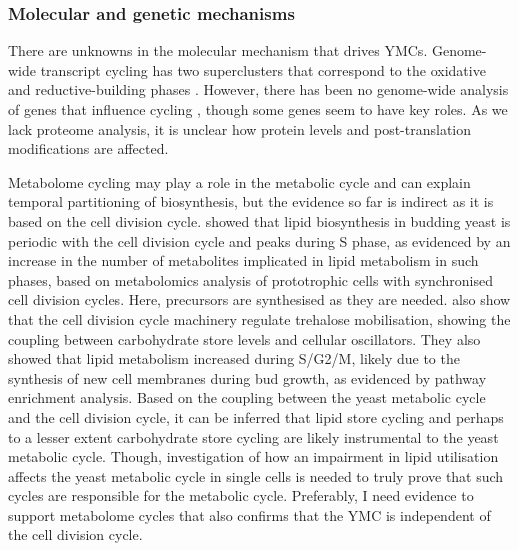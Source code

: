 \subsubsection{Molecular and genetic mechanisms}
\label{subsubsec:intro-ymc-unresolved-molecular}

There are unknowns in the molecular mechanism that drives YMCs.
Genome-wide transcript cycling has two superclusters that correspond to the oxidative and reductive-building phases \citep{machneYinYangYeast2012}.
However, there has been no genome-wide analysis of genes that influence cycling \citep{mellorMolecularBasisMetabolic2016}, though some genes seem to have key roles.
As we lack proteome analysis, it is unclear how protein levels and post-translation modifications are affected.


Metabolome cycling may play a role in the metabolic cycle and can explain temporal partitioning of biosynthesis, but the evidence so far is indirect as it is based on the cell division cycle.
\textcite{campbellBuildingBlocksAre2020} showed that lipid biosynthesis in budding yeast is periodic with the cell division cycle and peaks during S phase, as evidenced by an increase in the number of metabolites implicated in lipid metabolism in such phases, based on metabolomics analysis of prototrophic cells with synchronised cell division cycles.
Here, precursors are synthesised as they are needed.
\citet{ewaldYeastCyclinDependentKinase2016} also show that the cell division cycle machinery regulate trehalose mobilisation, showing the coupling between carbohydrate store levels and cellular oscillators.
They also showed that lipid metabolism increased during S/G2/M, likely due to the synthesis of new cell membranes during bud growth, as evidenced by pathway enrichment analysis.
Based on the coupling between the yeast metabolic cycle and the cell division cycle, it can be inferred that lipid store cycling and perhaps to a lesser extent carbohydrate store cycling are likely instrumental to the yeast metabolic cycle.
Though, investigation of how an impairment in lipid utilisation affects the yeast metabolic cycle in single cells is needed to truly prove that such cycles are responsible for the metabolic cycle.
Preferably, I need evidence to support metabolome cycles that also confirms that the YMC is independent of the cell division cycle.


